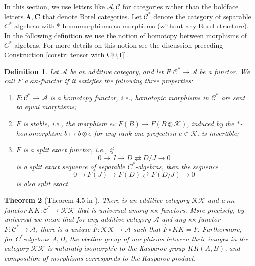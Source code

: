 \documentclass[12pt]{amsart}
\newtheorem{theorem}{Theorem}[section]
\newtheorem{definition}[theorem]{Definition}
\newcommand{\fancyK}{\mathcal{K}}
\begin{document}
In this section, we use letters like $\mathcal{A}, \mathcal{C}$ for categories rather than the boldface letters $\mathbf{A}, \mathbf{C}$ that denote Borel categories. Let $\mathcal{C}^*$ denote the category of separable $C^*$-algebras with *-homomorphisms as morphisms (without any Borel structure). In the following definition we use the notion of homotopy between morphisms of $C^*$-algebras. For more details on this notion see the discussion preceding Construction \ref{constr: tensor with C[0,1]}.
\begin{definition} \label{def: KK-functors}
    Let $\mathcal{A}$ be an additive category, and let $F \colon \mathcal{C}^* \rightarrow \mathcal{A}$ be a functor. We call $F$ a $\kappa \kappa$-functor if it satisfies the following three properties:
\begin{enumerate}
    \item $F \colon \mathcal{C}^* \rightarrow \mathcal{A}$ is a homotopy functor, i.e., homotopic morphisms in $\mathcal{C}^*$ are sent to equal morphisms;
    \item $F$ is stable, i.e., the morphism $e_* \colon F(B) \rightarrow F(B\otimes \fancyK)$, induced by the $*$-homomorphism $b \mapsto b \otimes e$ for any rank-one projection $e \in \fancyK$, is invertible;
    \item $F$ is a split exact functor, i.e., if
    \[
        0 \rightarrow J \rightarrow D \rightleftarrows D/J \rightarrow 0 
    \] is a split exact sequence of separable $C^*$-algebras, then the sequence
    \[
        0 \rightarrow F(J) \rightarrow F(D) \rightleftarrows F(D/J) \rightarrow 0
    \]
    is also split exact.
\end{enumerate}
\end{definition}

\begin{theorem}[Theorem 4.5 in \cite{Higson-KKtheory}] \label{thm: KK}
    There is an additive category $\mathcal{KK}$ and a $\kappa \kappa$-functor $KK \colon \mathcal{C}^* \rightarrow \mathcal{KK}$ that is universal among $\kappa \kappa$-functors. More precisely, by universal we mean that for any additive category $\mathcal{A}$ and any $\kappa \kappa$-functor $F \colon \mathcal{C}^* \rightarrow \mathcal{A}$, there is a unique $\widehat{F} \colon \mathcal{KK} \rightarrow \mathcal{A}$ such that $\widehat{F} \circ KK = F$. Furthermore, for $C^*$-algebras $A, B$, the abelian group of morphisms between their images in the category $\mathcal{KK}$ is naturally isomorphic to the Kasparov group $KK(A,B)$, and composition of morphisms corresponds to the Kasparov product.
\end{theorem}
\end{document}
